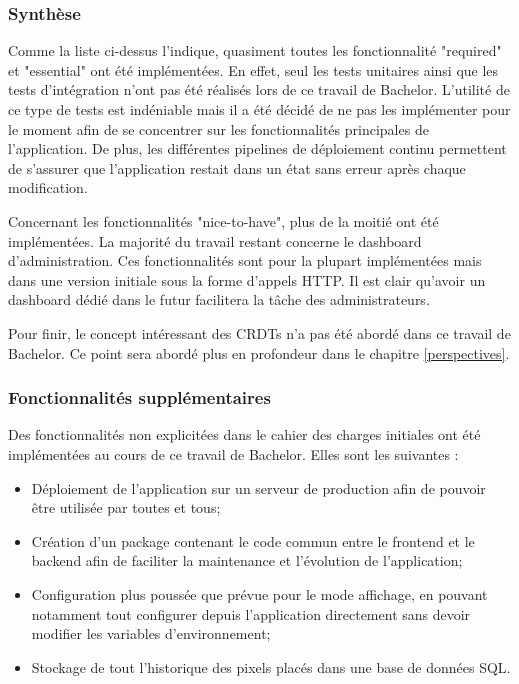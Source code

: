 \subsubsection{Synthèse}

Comme la liste ci-dessus l'indique, quasiment toutes les fonctionnalité "required" et "essential" ont été implémentées. En effet, seul les tests unitaires ainsi que les tests d'intégration n'ont pas été réalisés lors de ce travail de Bachelor. L'utilité de ce type de tests est indéniable mais il a été décidé de ne pas les implémenter pour le moment afin de se concentrer sur les fonctionnalités principales de l'application. De plus, les différentes pipelines de déploiement continu permettent de s'assurer que l'application restait dans un état sans erreur après chaque modification.

Concernant les fonctionnalités "nice-to-have", plus de la moitié ont été implémentées. La majorité du travail restant concerne le dashboard d'administration. Ces fonctionnalités sont pour la plupart implémentées mais dans une version initiale sous la forme d'appels HTTP. Il est clair qu'avoir un dashboard dédié dans le futur facilitera la tâche des administrateurs.

Pour finir, le concept intéressant des CRDTs n'a pas été abordé dans ce travail de Bachelor. Ce point sera abordé plus en profondeur dans le chapitre \ref{perspectives}.

\subsubsection{Fonctionnalités supplémentaires}

Des fonctionnalités non explicitées dans le cahier des charges initiales ont été implémentées au cours de ce travail de Bachelor. Elles sont les suivantes :


\begin{itemize}
  \item Déploiement de l'application sur un serveur de production afin de pouvoir être utilisée par toutes et tous;
  \item Création d'un package contenant le code commun entre le frontend et le backend afin de faciliter la maintenance et l'évolution de l'application;
  \item Configuration plus poussée que prévue pour le mode affichage, en pouvant notamment tout configurer depuis l'application directement sans devoir modifier les variables d'environnement;
  \item Stockage de tout l'historique des pixels placés dans une base de données SQL.
\end{itemize}

